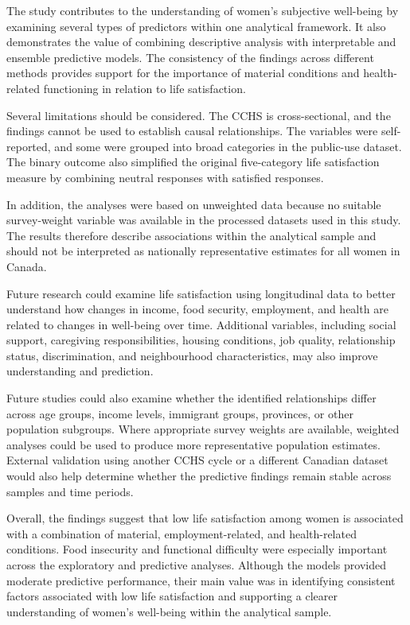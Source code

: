 \documentclass[12pt]{article}
\begin{document}
The study contributes to the understanding of women's subjective well-being by examining several types of predictors within one analytical framework. It also demonstrates the value of combining descriptive analysis with interpretable and ensemble predictive models. The consistency of the findings across different methods provides support for the importance of material conditions and health-related functioning in relation to life satisfaction.

Several limitations should be considered. The CCHS is cross-sectional, and the findings cannot be used to establish causal relationships. The variables were self-reported, and some were grouped into broad categories in the public-use dataset. The binary outcome also simplified the original five-category life satisfaction measure by combining neutral responses with satisfied responses.

In addition, the analyses were based on unweighted data because no
suitable survey-weight variable was available in the processed datasets
used in this study. The results therefore describe associations within the analytical sample and should not be interpreted as nationally representative estimates for all women in Canada.

Future research could examine life satisfaction using longitudinal data to better understand how changes in income, food security, employment, and health are related to changes in well-being over time. Additional variables, including social support, caregiving responsibilities, housing conditions, job quality, relationship status, discrimination, and neighbourhood characteristics, may also improve understanding and prediction.

Future studies could also examine whether the identified relationships differ across age groups, income levels, immigrant groups, provinces, or other population subgroups. Where appropriate survey weights are available, weighted analyses could be used to produce more representative population estimates. External validation using another CCHS cycle or a different Canadian dataset would also help determine whether the predictive findings remain stable across samples and time periods.

Overall, the findings suggest that low life satisfaction among women is associated with a combination of material, employment-related, and health-related conditions. Food insecurity and functional difficulty were especially important across the exploratory and predictive analyses. Although the models provided moderate predictive performance, their main value was in identifying consistent factors associated with low life satisfaction and supporting a clearer understanding of women's well-being within the analytical sample.
\end{document}
